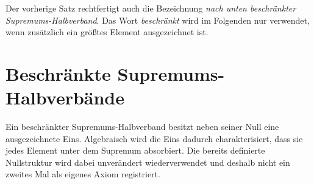 \documentclass[main.tex]{subfiles}
\begin{document}
\newpage
{}
\par\smallskip


\leavevmode\par\medskip

\begin{tabproof}
\end{tabproof}

\begin{remark}
Der vorherige Satz rechtfertigt auch die Bezeichnung
\emph{nach unten beschränkter Supremums-Halbverband}. Das Wort
\emph{beschränkt} wird im Folgenden nur verwendet, wenn zusätzlich ein
größtes Element ausgezeichnet ist.
\end{remark}

\section{Beschränkte Supremums-Halbverbände}

Ein beschränkter Supremums-Halbverband besitzt neben seiner Null eine
ausgezeichnete Eins. Algebraisch wird die Eins dadurch charakterisiert, dass
sie jedes Element unter dem Supremum absorbiert.
Die bereits definierte Nullstruktur wird dabei unverändert wiederverwendet
und deshalb nicht ein zweites Mal als eigenes Axiom registriert.
\end{document}
